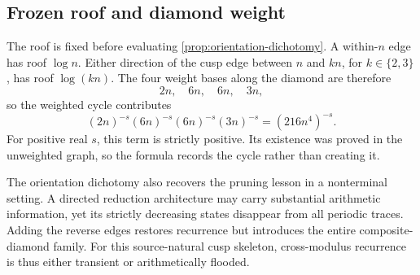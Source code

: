 \subsection{Frozen roof and diamond weight}

The roof is fixed before evaluating \cref{prop:orientation-dichotomy}.  A
within-$n$ edge has roof $\log n$.  Either direction of the cusp edge between
$n$ and $kn$, for $k\in\{2,3\}$, has roof $\log(kn)$.  The four weight bases
along the diamond are therefore
\[
 2n,\quad6n,\quad6n,\quad3n,
\]
so the weighted cycle contributes
\[
 (2n)^{-s}(6n)^{-s}(6n)^{-s}(3n)^{-s}
 =(216n^4)^{-s}.
\]
For positive real $s$, this term is strictly positive.  Its existence was
proved in the unweighted graph, so the formula records the cycle rather than
creating it.

The orientation dichotomy also recovers the pruning lesson in a nonterminal
setting.  A directed reduction architecture may carry substantial arithmetic
information, yet its strictly decreasing states disappear from all periodic
traces.  Adding the reverse edges restores recurrence but introduces the
entire composite-diamond family.  For this source-natural cusp skeleton,
cross-modulus recurrence is thus either transient or arithmetically flooded.
